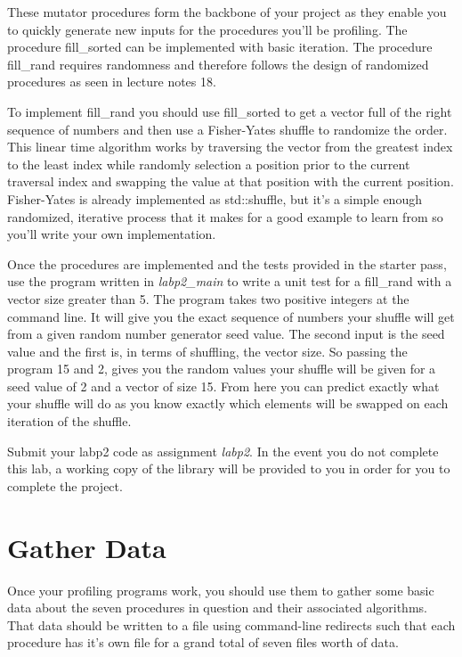 \documentclass[nobib]{tufte-handout}
\begin{document}
These mutator procedures form the backbone of your project as they enable you to quickly generate new inputs for the procedures you'll be profiling. The procedure fill\_sorted can be implemented with basic iteration. The procedure fill\_rand requires randomness and therefore follows the design of randomized procedures as seen in lecture notes 18.

To implement fill\_rand you should use fill\_sorted to get a vector full of the right sequence of numbers and then use a Fisher-Yates shuffle to randomize the order. This linear time algorithm works by traversing the vector from the greatest index to the least index while randomly selection a position prior to the current traversal index and swapping the value at that position with the current position. Fisher-Yates is already implemented as std::shuffle, but it's a simple enough randomized, iterative process that it makes for a good example to learn from so you'll write your own implementation.

Once the procedures are implemented and the tests provided in the starter pass, use the program written in \textit{labp2\_main} to write a unit test for a fill\_rand with a vector size greater than 5. The program takes two positive integers at the command line. It will give you the exact sequence of numbers your shuffle will get from a given random number generator seed value. The second input is the seed value and the first is, in terms of shuffling, the vector size. So passing the program 15 and 2, gives you the random values your shuffle will be given for a seed value of 2 and a vector of size 15. From here you can predict exactly what your shuffle will do as you know exactly which elements will be swapped on each iteration of the shuffle.

Submit your labp2 code as assignment \textit{labp2}.  In the event you do not complete this lab, a working copy of the library will be provided to you in order for you to complete the project.

\section{Gather Data}

Once your profiling programs work, you should use them to gather some basic data about the seven procedures in question and their associated algorithms. That data should be written to a file using command-line redirects such that each procedure has it's own file for a grand total of seven files worth of data.
\end{document}
